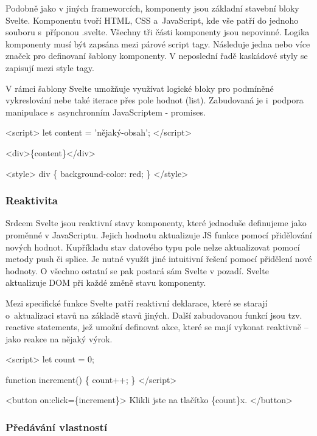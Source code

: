 Podobně jako v jiných frameworcích, komponenty jsou základní stavební bloky Svelte. Komponentu tvoří HTML, CSS a~JavaScript, kde vše patří do jednoho souboru s~příponou .svelte. 
Všechny tři části komponenty jsou nepovinné. Logika komponenty musí být zapsána mezi párové script tagy. Následuje jedna nebo více značek pro definovaní šablony komponenty. 
V neposlední řadě kaskádové styly se zapisují mezi style tagy.

V rámci šablony Svelte umožňuje využívat logické bloky pro podmíněné vykreslování nebe také iterace přes pole hodnot (list). 
Zabudovaná je i~podpora manipulace s~asynchronním JavaScriptem - promises.\cite{svelte}

\begin{prog}
<script>
  let content = 'nějaký-obsah';
</script>

<div>\{content\}</div>
  
<style>
  div \{
    background-color: red;
  \}
</style>
\end{prog}

\subsubsection{Reaktivita}

Srdcem Svelte jsou reaktivní stavy komponenty, které jednoduše definujeme jako proměnné v JavaScriptu. Jejich hodnotu aktualizuje JS funkce pomocí přidělování nových hodnot. 
Kupříkladu stav datového typu pole nelze aktualizovat pomocí metody push či splice. Je nutné využít jiné intuitivní řešení pomocí přidělení nové hodnoty.
O všechno ostatní se pak postará sám Svelte v pozadí. Svelte aktualizuje DOM při každé změně stavu komponenty. 

Mezi specifické funkce Svelte patří reaktivní deklarace, které se starají o~aktualizaci stavů na základě stavů jiných. 
Další zabudovanou funkcí jsou tzv. reactive statements, jež umožní definovat akce, které se mají vykonat reaktivně -- jako reakce na nějaký výrok.\cite{sveltehandbook,svelte}

\begin{prog}
<script>
  let count = 0;

  function increment() \{
    count++;
  \}
</script>

<button on:click=\{increment\}>
  Klikli jste na tlačítko \{count\}x.
</button>
\end{prog}

\subsubsection{Předávání vlastností}

